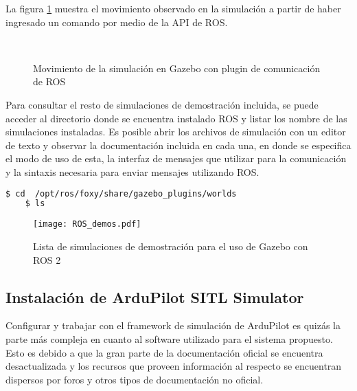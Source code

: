 La figura \ref{fig:rossims} muestra el movimiento observado en la simulación  a partir de haber ingresado un comando por medio de la API de ROS.

\begin{figure}[ht]
    \centering
    \hfill
    \\
    \hfill
    \caption{Movimiento de la simulación en Gazebo con plugin de comunicación de ROS}
    \label{fig:rossims}
\end{figure}


Para consultar el resto de simulaciones de demostración incluida, se puede acceder al directorio donde se encuentra instalado ROS y listar los nombre de las simulaciones instaladas. Es posible abrir los archivos de simulación con un editor de texto y observar la documentación incluida en cada una, en donde se especifica el modo de uso de esta, la interfaz de mensajes que utilizar para la comunicación y la sintaxis necesaria para enviar mensajes utilizando ROS.

\begin{lstlisting}[language = bash]
    $ cd  /opt/ros/foxy/share/gazebo_plugins/worlds
    $ ls 
\end{lstlisting}

\begin{figure}[ht]
    \centering
    \texttt{[image: ROS\_demos.pdf]}
    \caption{Lista de simulaciones de demostración para el uso de Gazebo con ROS 2}
    \label{fig:ROS_demos}
\end{figure}

\subsection{Instalación de ArduPilot SITL Simulator}
Configurar y trabajar con el framework de simulación de ArduPilot es quizás la parte más compleja en cuanto al software utilizado para el sistema propuesto. Esto es debido a que la gran parte de la documentación oficial se encuentra desactualizada y los recursos que proveen información al respecto se encuentran dispersos por foros y otros tipos de documentación no oficial. 

